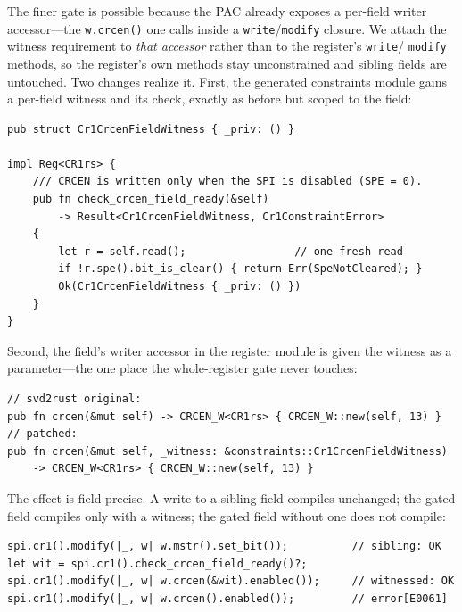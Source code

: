 The finer gate is possible because the PAC already exposes a per-field
writer accessor---the \texttt{w.crcen()} one calls inside a
\texttt{write}/\texttt{modify} closure. We attach the witness requirement to
\emph{that accessor} rather than to the register's \texttt{write}/%
\texttt{modify} methods, so the register's own methods stay unconstrained and
sibling fields are untouched. Two changes realize it. First, the generated
constraints module gains a per-field witness and its check, exactly as
before but scoped to the field:

\begin{lstlisting}
pub struct Cr1CrcenFieldWitness { _priv: () }

impl Reg<CR1rs> {
    /// CRCEN is written only when the SPI is disabled (SPE = 0).
    pub fn check_crcen_field_ready(&self)
        -> Result<Cr1CrcenFieldWitness, Cr1ConstraintError>
    {
        let r = self.read();                 // one fresh read
        if !r.spe().bit_is_clear() { return Err(SpeNotCleared); }
        Ok(Cr1CrcenFieldWitness { _priv: () })
    }
}
\end{lstlisting}

Second, the field's writer accessor in the register module is given the
witness as a parameter---the one place the whole-register gate never
touches:

\begin{lstlisting}[caption={The field's writer accessor, before and after
the patch. \texttt{CR1rs} is \texttt{svd2rust}'s zero-sized register-spec
marker type for the \texttt{CR1} register---the register handle is
\texttt{Reg<CR1rs>}, and the \texttt{rs} suffix is the tool's naming
convention. It is distinct from our generated witness type
\texttt{Cr1CrcenFieldWitness}, whose \texttt{Cr1} is a capitalized register
name we chose.}]
// svd2rust original:
pub fn crcen(&mut self) -> CRCEN_W<CR1rs> { CRCEN_W::new(self, 13) }
// patched:
pub fn crcen(&mut self, _witness: &constraints::Cr1CrcenFieldWitness)
    -> CRCEN_W<CR1rs> { CRCEN_W::new(self, 13) }
\end{lstlisting}

The effect is field-precise. A write to a sibling field compiles unchanged;
the gated field compiles only with a witness; the gated field without one
does not compile:

\begin{lstlisting}
spi.cr1().modify(|_, w| w.mstr().set_bit());          // sibling: OK
let wit = spi.cr1().check_crcen_field_ready()?;
spi.cr1().modify(|_, w| w.crcen(&wit).enabled());     // witnessed: OK
spi.cr1().modify(|_, w| w.crcen().enabled());         // error[E0061]
\end{lstlisting}

